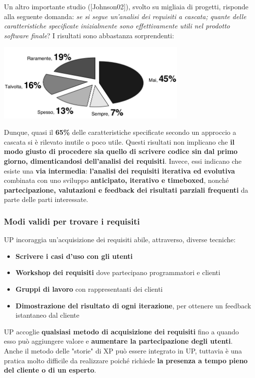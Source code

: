 \documentclass[12pt]{article}
\begin{document}
Un altro importante studio ([Johnson02]), svolto su migliaia di progetti, risponde alla seguente domanda: \textit{se si segue un'analisi dei requisiti a cascata; quante delle caratteristiche specificate inizialmente sono effettivamente utili nel prodotto software finale}?
I risultati sono abbastanza sorprendenti:
\begin{center}
    \includegraphics[width = 0.70\textwidth]{Images/30.PNG}
\end{center}
Dunque, quasi il \textbf{65\%} delle caratteristiche specificate secondo un approccio a cascata si è rilevato inutile o poco utile.
Questi risultati non implicano che \textbf{il modo giusto di procedere sia quello di scrivere codice sin dal primo giorno, dimenticandosi dell'analisi dei requisiti}.
Invece, essi indicano che esiste una \textbf{via intermedia}: \textbf{l'analisi dei requisiti iterativa ed evolutiva} combinata con uno sviluppo \textbf{anticipato, iterativo e timeboxed}, nonché \textbf{partecipazione, valutazioni e feedback dei risultati parziali frequenti} da parte delle parti interessate.
\subsubsection{Modi validi per trovare i requisiti}
UP incoraggia un'acquisizione dei requisiti abile, attraverso, diverse tecniche:
\begin{itemize}
    \item \textbf{Scrivere i casi d'uso con gli utenti}
    \item \textbf{Workshop dei requisiti} dove partecipano programmatori e clienti
    \item \textbf{Gruppi di lavoro} con rappresentanti dei clienti
    \item \textbf{Dimostrazione del risultato di ogni iterazione}, per ottenere un feedback istantaneo dal cliente
\end{itemize}
UP accoglie \textbf{qualsiasi metodo di acquisizione dei requisiti} fino a quando esso può aggiungere valore e \textbf{aumentare la partecipazione degli utenti}.
Anche il metodo delle "storie" di XP può essere integrato in UP, tuttavia è una pratica molto difficile da realizzare poiché richiede \textbf{la presenza a tempo pieno del cliente o di un esperto}.
\end{document}
